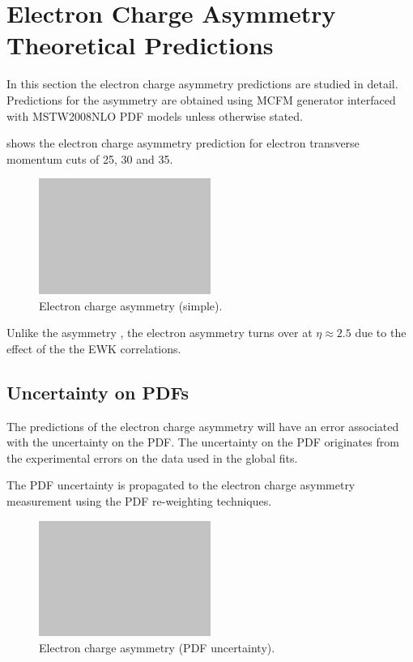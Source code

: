 \section{Electron Charge Asymmetry Theoretical Predictions}

In this section the electron charge asymmetry predictions are studied in detail.
Predictions for the asymmetry are obtained using MCFM \cite{test} generator
interfaced with MSTW2008NLO PDF models unless otherwise stated.

 shows the electron charge asymmetry prediction for
electron transverse momentum cuts of 25, 30 and \unit{35}{\GeV}.


\begin{figure}[htb]
  \centering
  \includegraphics[width=0.5\textwidth]{placeholder}
  \caption{Electron charge asymmetry (simple).}
  \label{wbos:asym_simple}
\end{figure}

Unlike the \PW asymmetry , the electron asymmetry turns over at $\eta\approx
2.5$ due to the effect of the the \ac{EWK} correlations.

\subsection{Uncertainty on \acp{PDF}}

The predictions of the electron charge asymmetry will have an error associated
with the uncertainty on the \ac{PDF}.
The uncertainty on the \ac{PDF} originates from the experimental errors on the
data used in the global fits.

The \ac{PDF} uncertainty is propagated to the electron charge asymmetry
measurement using the \ac{PDF} re-weighting techniques\cite{}.

\begin{figure}[htb]
  \centering
  \includegraphics[width=0.5\textwidth]{placeholder}
  \caption{Electron charge asymmetry (PDF uncertainty).}
  \label{wbos:asym_pdfuncert}
\end{figure}

